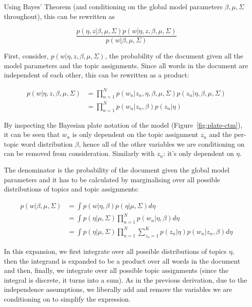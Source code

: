 \documentclass[12pt,a4paper,twoside,openright]{report}
\begin{document}
Using Bayes' Theorem (and conditioning on the global model parameters $\beta, \mu, \Sigma$ throughout), this can be rewritten as 

\begin{equation}
\frac{p(\eta, z | \beta, \mu, \Sigma) p(w | \eta, z, \beta, \mu, \Sigma)}{p(w | \beta, \mu, \Sigma)}
\end{equation}

First, consider, $p(w | \eta, z, \beta, \mu, \Sigma)$, the probability of the document given all the model parameters and the topic assignments. Since all words in the document are independent of each other, this can be rewritten as a product:

\begin{align}
p(w | \eta, z, \beta, \mu, \Sigma) &= \prod\limits_{n=1}^N p(w_n | z_n, \eta, \beta, \mu, \Sigma) p(z_n | \eta, \beta, \mu, \Sigma)\\
& = \prod\limits_{n=1}^N p(w_n | z_n, \beta) p(z_n | \eta)
\end{align}

By inspecting the Bayesian plate notation of the model (Figure~\ref{fig:plate-ctm}), it can be seen that $w_n$ is only dependent on the topic assignment $z_n$ and the per-topic word distribution $\beta$, hence all of the other variables we are conditioning on can be removed from consideration. Similarly with $z_n$: it's only dependent on $\eta$.

The denominator is the probability of the document given the global model parameters and it has to be calculated by marginalising over all possible distributions of topics and topic assignments:

\begin{align}
p(w | \beta, \mu, \Sigma) & = \int p(w | \eta, \beta) p(\eta | \mu, \Sigma) d\eta \\
& =\int p(\eta | \mu, \Sigma)  \prod\limits_{n=1}^N p(w_n | \eta, \beta) d\eta \\
& =\int p(\eta | \mu, \Sigma)  \prod\limits_{n=1}^N \sum\limits_{z_n=1}^K p(z_n | \eta) p(w_n | z_n, \beta) d\eta
\end{align}

In this expansion, we first integrate over all possible distributions of topics $\eta$, then the integrand is expanded to be a product over all words in the document and then, finally, we integrate over all possible topic assignments (since the integral is discrete, it turns into a sum). As in the previous derivation, due to the independence assumptions, we liberally add and remove the variables we are conditioning on to simplify the expression.
\end{document}
